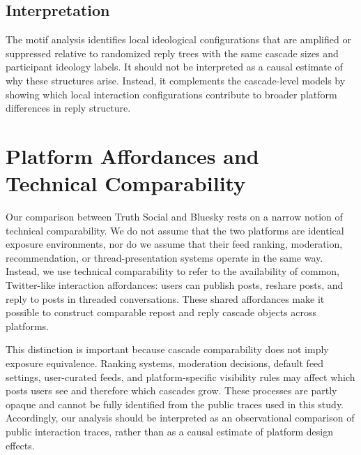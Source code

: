 \documentclass[letterpaper]{article} %
\begin{document}
\subsection*{Interpretation}

The motif analysis identifies local ideological configurations that are amplified or suppressed relative to randomized reply trees with the same cascade sizes and participant ideology labels. It should not be interpreted as a causal estimate of why these structures arise. Instead, it complements the cascade-level models by showing which local interaction configurations contribute to broader platform differences in reply structure.

\section{Platform Affordances and Technical Comparability}
\label{app:platform_affordances}

Our comparison between Truth Social and Bluesky rests on a narrow notion of technical comparability. We do not assume that the two platforms are identical exposure environments, nor do we assume that their feed ranking, moderation, recommendation, or thread-presentation systems operate in the same way. Instead, we use technical comparability to refer to the availability of common, Twitter-like interaction affordances: users can publish posts, reshare posts, and reply to posts in threaded conversations. These shared affordances make it possible to construct comparable repost and reply cascade objects across platforms.

This distinction is important because cascade comparability does not imply exposure equivalence. Ranking systems, moderation decisions, default feed settings, user-curated feeds, and platform-specific visibility rules may affect which posts users see and therefore which cascades grow. These processes are partly opaque and cannot be fully identified from the public traces used in this study. Accordingly, our analysis should be interpreted as an observational comparison of public interaction traces, rather than as a causal estimate of platform design effects.
\end{document}
